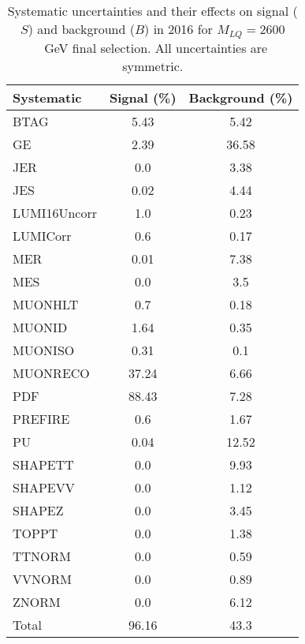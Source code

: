 \begin{table}[htbp]
\begin{center}
\caption{Systematic uncertainties and their effects on signal ($S$) and background ($B$) in 2016 for $M_{LQ}=2600$~GeV final selection. All uncertainties are symmetric.}
\begin{tabular}{lcc}
\hline\hline
Systematic & Signal (\%) & Background (\%) \\ \hline 
BTAG & 5.43 & 5.42\\ 
GE & 2.39 & 36.58\\ 
JER & 0.0 & 3.38\\ 
JES & 0.02 & 4.44\\ 
LUMI16Uncorr & 1.0 & 0.23\\ 
LUMICorr & 0.6 & 0.17\\ 
MER & 0.01 & 7.38\\ 
MES & 0.0 & 3.5\\ 
MUONHLT & 0.7 & 0.18\\ 
MUONID & 1.64 & 0.35\\ 
MUONISO & 0.31 & 0.1\\ 
MUONRECO & 37.24 & 6.66\\ 
PDF & 88.43 & 7.28\\ 
PREFIRE & 0.6 & 1.67\\ 
PU & 0.04 & 12.52\\ 
SHAPETT & 0.0 & 9.93\\ 
SHAPEVV & 0.0 & 1.12\\ 
SHAPEZ & 0.0 & 3.45\\ 
TOPPT & 0.0 & 1.38\\ 
TTNORM & 0.0 & 0.59\\ 
VVNORM & 0.0 & 0.89\\ 
ZNORM & 0.0 & 6.12\\ 
Total & 96.16 & 43.3\\ \hline \hline
\end{tabular}
\label{tab:SysUncertainties_uujj_2600}
\end{center}
\end{table}

